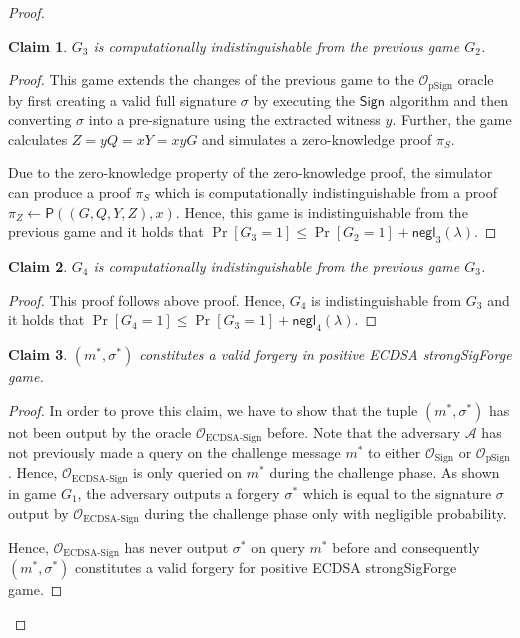 \documentclass{llncs}
\newtheorem{Claim}{Claim}
\begin{document}
\begin{proof}
\begin{Claim}
$G_3$ is computationally indistinguishable from the previous game $G_2$.
\end{Claim}

\begin{proof}
This game extends the changes of the previous game to the $\mathcal{O}_{\text{pSign}}$ oracle by first creating a valid full signature $\sigma$ by executing the $\mathsf{Sign}$ algorithm and then converting $\sigma$ into a pre-signature using the extracted witness $y$. Further, the game calculates $Z=yQ=xY=xyG$ and simulates a zero-knowledge proof $\pi_S$.

Due to the zero-knowledge property of the zero-knowledge proof, the simulator can produce a proof $\pi_S$ which is computationally indistinguishable from a proof $\pi_Z\leftarrow \mathsf{P}((G,Q,Y,Z),x)$. Hence, this game is indistinguishable from the previous game and it holds that $\Pr[G_3 = 1] \leq \Pr[G_2 = 1] + \mathsf{negl}_3(\lambda)$.
\end{proof}

\begin{Claim}
$G_4$ is computationally indistinguishable from the previous game $G_3$.
\end{Claim}

\begin{proof}
This proof follows above proof. Hence, $G_4$ is indistinguishable from $G_3$ and it holds that 
$\Pr[G_4= 1] \leq \Pr[G_3 = 1] + \mathsf{negl}_4(\lambda)$.
\end{proof}

\begin{Claim}
$(m^*,\sigma^*)$ constitutes a valid forgery in positive ECDSA strongSigForge game.
\end{Claim}

\begin{proof}
In order to prove this claim, we have to show that the tuple $(m^*,\sigma^*)$ has not been output by the oracle $\mathcal{O}_{\text{ECDSA-Sign}}$ before. Note that the adversary $\mathcal{A}$ has not previously made a query on the challenge message $m^*$ to either $\mathcal{O}_{\text{Sign}}$ or $\mathcal{O}_{\text{pSign}}$. Hence, $\mathcal{O}_{\text{ECDSA-Sign}}$ is only queried on $m^*$ during the challenge phase. As shown in game $G_1$, the adversary outputs a forgery $\sigma^*$ which is equal to the signature $\sigma$ output by $\mathcal{O}_{\text{ECDSA-Sign}}$ during the challenge phase only with negligible probability. 

Hence, $\mathcal{O}_{\text{ECDSA-Sign}}$ has never output $\sigma^*$ on query $m^*$ before and consequently $(m^*, \sigma^*)$ constitutes a valid forgery for positive ECDSA strongSigForge game. 
\end{proof}


\end{proof}
\end{document}
